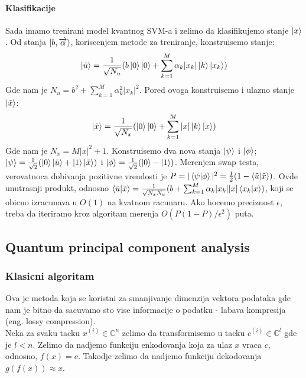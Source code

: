 \documentclass[12pt, letterpaper, oneside]{article}
\begin{document}
\paragraph*{Klasifikacije}
Sada imamo trenirani model kvantnog SVM-a i zelimo da klasifikujemo stanje $\Ket{x}$. Od stanja $\Ket{b,\overrightarrow{\alpha}}$, koriscenjem metode za treniranje, konstruisemo stanje:
\[
    \Ket{\tilde{u}} = \frac{1}{\sqrt{N_u}}(b\Ket{0}\Ket{0} + \sum_{k=1}^M{\alpha_k |x_k| \Ket{k}\Ket{x_k}})
\]
Gde nam je $N_u=b^2+\sum_{k=1}^M{\alpha_k^2 |x_k|^2}$. Pored ovoga konstruisemo i ulazno stanje $\Ket{\tilde{x}}$:
\[
    \Ket{\tilde{x}} = \frac{1}{\sqrt{N_x}}(\Ket{0}\Ket{0} + \sum_{k=1}^M{|x|\Ket{k}\Ket{x}})
\]
Gde nam je $N_x=M|x|^2 + 1$. Konstruisemo dva nova stanja $\Ket{\psi}$ i $\Ket{\phi}$; $\Ket{\psi}=\frac{1}{\sqrt{2}}(\Ket{0}\Ket{\tilde{u}}+\Ket{1}\Ket{\tilde{x}})$ i
$\Ket{\phi} = \frac{1}{\sqrt{2}}(\Ket{0}-\Ket{1})$. Merenjem swap testa, verovatnoca dobivanja pozitivne vrendosti je $P=|\braket{\psi|\phi}|^2=\frac{1}{2}(1-\braket{\tilde{u}|\tilde{x}})$. 
Ovde unutrasnji produkt, odnosno 
$\braket{\tilde{u}|\tilde{x}} = \frac{1}{\sqrt{N_xN_u}}(b+\sum_{k=1}^M{\alpha_k |x_k||x|\braket{x_k|x}})$, koji se obicno izracunava u $O(1)$ na kvatnom racunaru.
Ako hocemo preciznost $\epsilon$, treba da iteriramo kroz algoritam merenja $O(P(1-P)/\epsilon^2)$ puta. \cite{rebentrost2014quantum}
\subsection{Quantum principal component analysis}
\subsubsection{Klasicni algoritam}
Ova je metoda koja se koristni za smanjivanje dimenzija vektora podataka gde nam je bitno da sacuvamo sto vise informacije o podatku -
labava kompresija (eng. lossy compression). \\
Neka za svaku tacku $x^{(i)} \in \mathbb{C}^n$ zelimo da transformisemo u tacku $c^{(i)} \in \mathbb{C}^l$ gde je $l < n$.
Zelimo da nadjemo funkciju enkodovanja koja za ulaz $x$ vraca $c$, odnosno, $f(x)=c$. Takodje zelimo da nadjemo funkciju dekodovanja $g(f(x)) \approx x$.
\end{document}
